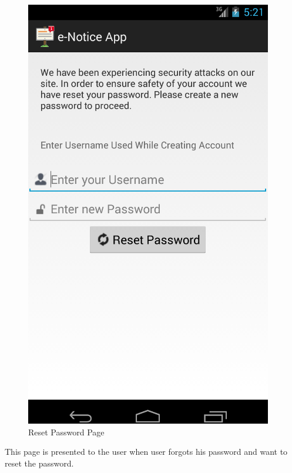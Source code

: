 \begin{figure}[H]
\centering \includegraphics[scale=0.7]{image/reset.png}
\caption{Reset Password Page}
\end{figure}

This page is presented to the user when user forgots his password and want to reset the password.

